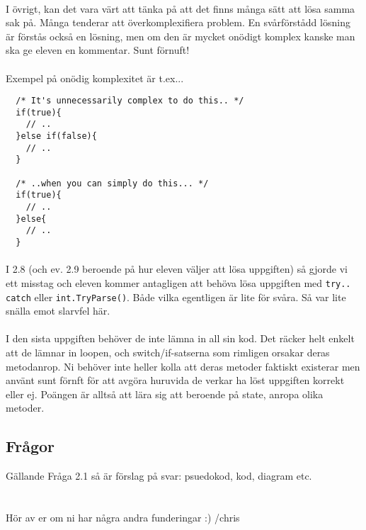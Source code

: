 \documentclass{article}
\begin{document}
  \paragraph{}
  I övrigt, kan det vara värt att tänka på att det finns många sätt att lösa samma sak på. Många tenderar att överkomplexifiera problem. En svårförstådd lösning är förstås också en lösning, men om den är mycket onödigt komplex kanske man ska ge eleven en kommentar. Sunt förnuft!
  \paragraph{}
  Exempel på onödig komplexitet är t.ex...
  \begin{lstlisting}
  /* It's unnecessarily complex to do this.. */
  if(true){
    // ..
  }else if(false){
    // ..
  }

  /* ..when you can simply do this... */
  if(true){
    // ..
  }else{
    // ..
  }
  \end{lstlisting}

  \paragraph{}
  I 2.8 (och ev. 2.9 beroende på hur eleven väljer att lösa uppgiften) så gjorde vi ett misstag och eleven kommer antagligen att behöva lösa uppgiften med \texttt{try.. catch} eller \texttt{int.TryParse()}. Både vilka egentligen är lite för svåra. Så var lite snälla emot slarvfel här.

  \paragraph{}
  I den sista uppgiften behöver de inte lämna in all sin kod. Det räcker helt enkelt att de lämnar in loopen, och switch/if-satserna som rimligen orsakar deras metodanrop. Ni behöver inte heller kolla att deras metoder faktiskt existerar men använt sunt förnft för att avgöra huruvida de verkar ha löst uppgiften korrekt eller ej. Poängen är alltså att lära sig att beroende på state, anropa olika metoder.

  \subsection*{Frågor}
  Gällande Fråga 2.1 så är förslag på svar: psuedokod, kod, diagram etc.


  \section*{}
  Hör av er om ni har några andra funderingar :)
  /chris
\end{document}
